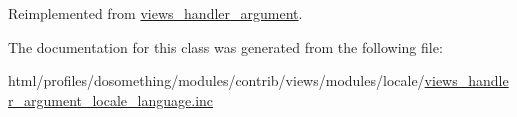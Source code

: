 Reimplemented from \hyperlink{classviews__handler__argument_a76181ac24e7be4a09aaafc1fa5f15ea1}{views\_\-handler\_\-argument}.

The documentation for this class was generated from the following file:\begin{DoxyCompactItemize}
\item 
html/profiles/dosomething/modules/contrib/views/modules/locale/\hyperlink{views__handler__argument__locale__language_8inc}{views\_\-handler\_\-argument\_\-locale\_\-language.inc}\end{DoxyCompactItemize}
